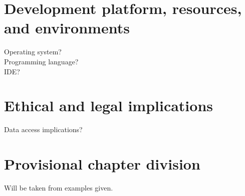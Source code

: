 \section{Development platform, resources, and environments}
Operating system?\\
Programming language?\\
IDE?\\
\section{Ethical and legal implications}
Data access implications?
\section{Provisional chapter division}
Will be taken from examples given.